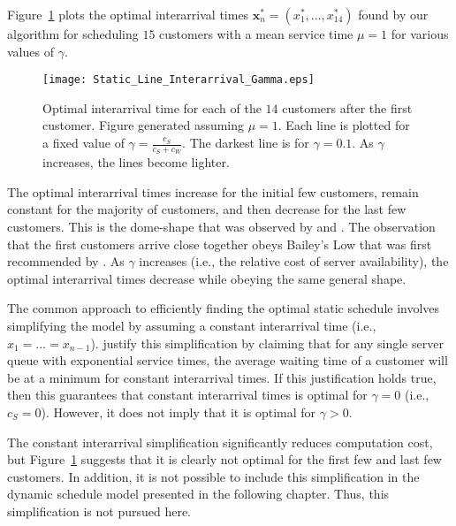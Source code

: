 Figure~\ref{fig:Static_Time_Gamma} plots the optimal interarrival times $\mathbf{x}_{n}^{*} = (x_{1}^{*}, \ldots, x_{14}^{*})$ found by our algorithm for scheduling $15$ customers with a mean service time $\mu = 1$ for various values of $\gamma$.
\begin{figure}[htb]
	\centering
	\texttt{[image: Static\_Line\_Interarrival\_Gamma.eps]}
	\caption{Optimal interarrival time for each of the $14$ customers after the first customer. Figure generated assuming $\mu = 1$. Each line is plotted for a fixed value of $\gamma = \frac{c_{S}}{c_{S} + c_{W}}$. The darkest line is for $\gamma = 0.1$. As $\gamma$ increases, the lines become lighter.}
	\label{fig:Static_Time_Gamma}
\end{figure}

The optimal interarrival times increase for the initial few customers, remain constant for the majority of customers, and then decrease for the last few customers. This is the dome-shape that was observed by \citet{Stein} and \citet{Mendel}. The observation that the first customers arrive close together obeys Bailey's Low that was first recommended by \citet{Bailey}. As $\gamma$ increases (i.e., the relative cost of server availability), the optimal interarrival times decrease while obeying the same general shape.

The common approach to efficiently finding the optimal static schedule involves simplifying the model by assuming a constant interarrival time (i.e., $x_{1} = \ldots = x_{n - 1}$). \citet{Stein} justify this simplification by claiming that for any single server queue with exponential service times, the average waiting time of a customer will be at a minimum for constant interarrival times. If this justification holds true, then this guarantees that constant interarrival times is optimal for $\gamma = 0$ (i.e., $c_{S} = 0$). However, it does not imply that it is optimal for $\gamma > 0$.

The constant interarrival simplification significantly reduces computation cost, but Figure~\ref{fig:Static_Time_Gamma} suggests that it is clearly not optimal for the first few and last few customers. In addition, it is not possible to include this simplification in the dynamic schedule model presented in the following chapter. Thus, this simplification is not pursued here.










































